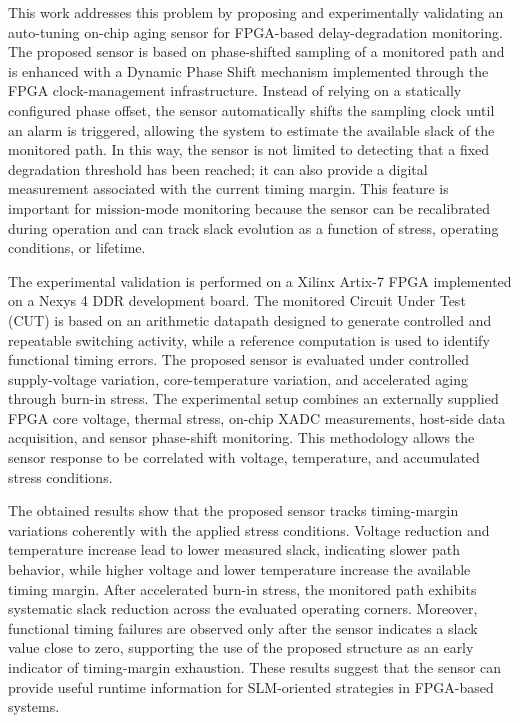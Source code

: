 \documentclass[a4paper,10pt,twoside,twocolumn,final]{JICS_LaTexGuidelines}
\begin{document}
This work addresses this problem by proposing and experimentally validating an auto-tuning on-chip aging sensor for FPGA-based delay-degradation monitoring. The proposed sensor is based on phase-shifted sampling of a monitored path and is enhanced with a Dynamic Phase Shift mechanism implemented through the FPGA clock-management infrastructure. Instead of relying on a statically configured phase offset, the sensor automatically shifts the sampling clock until an alarm is triggered, allowing the system to estimate the available slack of the monitored path. In this way, the sensor is not limited to detecting that a fixed degradation threshold has been reached; it can also provide a digital measurement associated with the current timing margin. This feature is important for mission-mode monitoring because the sensor can be recalibrated during operation and can track slack evolution as a function of stress, operating conditions, or lifetime.

The experimental validation is performed on a Xilinx Artix-7 FPGA implemented on a Nexys 4 DDR development board. The monitored Circuit Under Test (CUT) is based on an arithmetic datapath designed to generate controlled and repeatable switching activity, while a reference computation is used to identify functional timing errors. The proposed sensor is evaluated under controlled supply-voltage variation, core-temperature variation, and accelerated aging through burn-in stress. The experimental setup combines an externally supplied FPGA core voltage, thermal stress, on-chip XADC measurements, host-side data acquisition, and sensor phase-shift monitoring. This methodology allows the sensor response to be correlated with voltage, temperature, and accumulated stress conditions.

The obtained results show that the proposed sensor tracks timing-margin variations coherently with the applied stress conditions. Voltage reduction and temperature increase lead to lower measured slack, indicating slower path behavior, while higher voltage and lower temperature increase the available timing margin. After accelerated burn-in stress, the monitored path exhibits systematic slack reduction across the evaluated operating corners. Moreover, functional timing failures are observed only after the sensor indicates a slack value close to zero, supporting the use of the proposed structure as an early indicator of timing-margin exhaustion. These results suggest that the sensor can provide useful runtime information for SLM-oriented strategies in FPGA-based systems.
\end{document}
